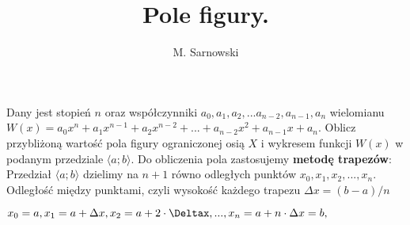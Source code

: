 \documentclass[a4paper,11pt]{article}
\author{M. Sarnowski}
\title{Pole figury.}
\begin{document}
\maketitle
\begin{flushleft}
Dany jest stopień $n$ oraz współczynniki $a_{0}, a_{1}, a_{2}, ... a_{n-2}, a_{n-1}, a_{n}$ wielomianu $W\left( x \right) = a_{0}x^{n} + a_{1}x^{n-1} + a_{2}x^{n-2} + ... + a_{n-2}x^{2} + a_{n-1}x + a_{n}$.
\newline
Oblicz przybliżoną wartość pola figury ograniczonej osią $X$ i wykresem funkcji $W\left( x \right)$ w podanym przedziale $\langle a;b \rangle$.
\newline
Do obliczenia pola zastosujemy \textbf{metodę trapezów}:
\newline
Przedział $\langle a;b \rangle$ dzielimy na $n + 1$ równo odległych punktów $x_{0}, x_{1}, x_{2}, ... , x_{n}$.
\newline
Odległość między punktami, czyli wysokość każdego trapezu $\Delta x = (b - a)/n$ 
\end{flushleft}
\begin{center}
$x_{0} = a, x_{1} = a + \Delta x, x_{2} = a + 2 \cdot \Deltax, ... , x_{n} = a + n \cdot \Delta x = b, $
\end{center}
\end{document}
